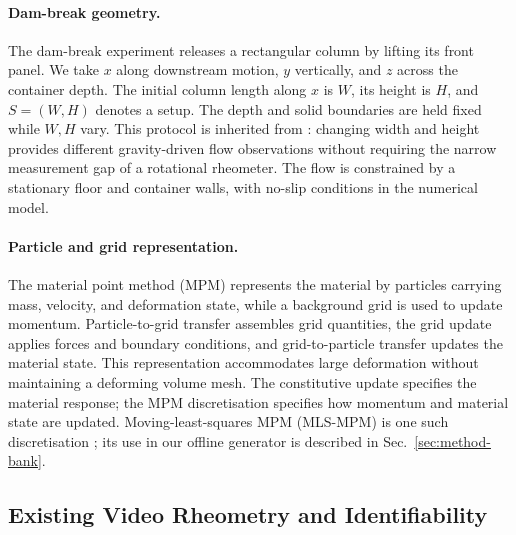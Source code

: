 \paragraph{Dam-break geometry.}
The dam-break experiment releases a rectangular column by lifting its
front panel. We take $x$ along downstream motion, $y$ vertically, and
$z$ across the container depth. The initial column length along $x$
is $W$, its height is $H$, and $S=(W,H)$ denotes a setup. The depth
and solid boundaries are held fixed while $W,H$ vary. This protocol
is inherited from \citet{hamamichi2023nonnewtonian}: changing width
and height provides different gravity-driven flow observations without
requiring the narrow measurement gap of a rotational rheometer.
The flow is constrained by a stationary floor and container walls,
with no-slip conditions in the numerical model.


\paragraph{Particle and grid representation.}
The material point method (MPM) represents the material by particles
carrying mass, velocity, and deformation state, while a background
grid is used to update momentum. Particle-to-grid transfer assembles
grid quantities, the grid update applies forces and boundary
conditions, and grid-to-particle transfer updates the material state.
This representation accommodates large deformation without maintaining
a deforming volume mesh.
The constitutive update specifies the material response; the MPM
discretisation specifies how momentum and material state are updated.
Moving-least-squares MPM (MLS-MPM) is one such discretisation
\cite{hu2018moving}; its use in our offline generator is described in
Sec.~\ref{sec:method-bank}.


\subsection{Existing Video Rheometry and Identifiability}
\label{sec:prior-inverse}

